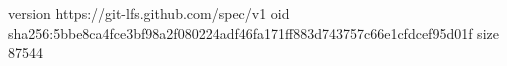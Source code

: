 version https://git-lfs.github.com/spec/v1
oid sha256:5bbe8ca4fce3bf98a2f080224adf46fa171ff883d743757c66e1cfdcef95d01f
size 87544
